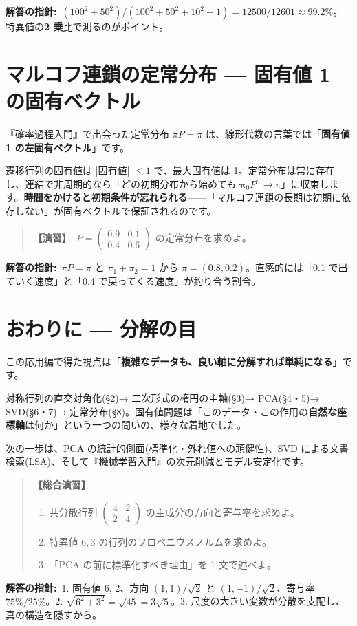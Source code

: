 \documentclass{article}
\begin{document}
\textbf{解答の指針:}\ \((100^2 + 50^2)/(100^2 + 50^2 + 10^2 + 1) = 12500/12601 \approx 99.2\%\)。特異値の\textbf{2 乗}比で測るのがポイント。

\section{マルコフ連鎖の定常分布 — 固有値 1 の固有ベクトル}

『確率過程入門』で出会った定常分布 \(\pi P = \pi\) は、線形代数の言葉では「\textbf{固有値 1 の左固有ベクトル}」です。

遷移行列の固有値は |固有値| \(\le 1\) で、最大固有値は 1。定常分布は常に存在し、連結で非周期的なら「どの初期分布から始めても \(\boldsymbol{\pi}_0 P^n \to \pi\)」に収束します。\textbf{時間をかけると初期条件が忘れられる}——「マルコフ連鎖の長期は初期に依存しない」が固有ベクトルで保証されるのです。

\begin{quote}
\textbf{【演習】}\ \(P = \begin{pmatrix} 0.9 & 0.1 \\ 0.4 & 0.6 \end{pmatrix}\) の定常分布を求めよ。
\end{quote}

\textbf{解答の指針:}\ \(\pi P = \pi\) と \(\pi_1 + \pi_2 = 1\) から \(\pi = (0.8, 0.2)\)。直感的には「0.1 で出ていく速度」と「0.4 で戻ってくる速度」が釣り合う割合。

\section{おわりに — 分解の目}

この応用編で得た視点は「\textbf{複雑なデータも、良い軸に分解すれば単純になる}」です。

対称行列の直交対角化(§2)→ 二次形式の楕円の主軸(§3)→ PCA(§4・5)→ SVD(§6・7)→ 定常分布(§8)。固有値問題は「このデータ・この作用の\textbf{自然な座標軸}は何か」という一つの問いの、様々な着地でした。

次の一歩は、PCA の統計的側面(標準化・外れ値への頑健性)、SVD による文書検索(LSA)、そして『機械学習入門』の次元削減とモデル安定化です。

\begin{quote}
\textbf{【総合演習】}
\begin{enumerate}
\item 共分散行列 \(\begin{pmatrix} 4 & 2 \\ 2 & 4 \end{pmatrix}\) の主成分の方向と寄与率を求めよ。
\item 特異値 \(6, 3\) の行列のフロベニウスノルムを求めよ。
\item 「PCA の前に標準化すべき理由」を 1 文で述べよ。
\end{enumerate}
\end{quote}

\textbf{解答の指針:}\ 1. 固有値 6, 2、方向 \((1,1)/\sqrt{2}\) と \((1,-1)/\sqrt{2}\)、寄与率 \(75\% / 25\%\)。2. \(\sqrt{6^2 + 3^2} = \sqrt{45} = 3\sqrt{5}\)。3. 尺度の大きい変数が分散を支配し、真の構造を隠すから。
\end{document}
